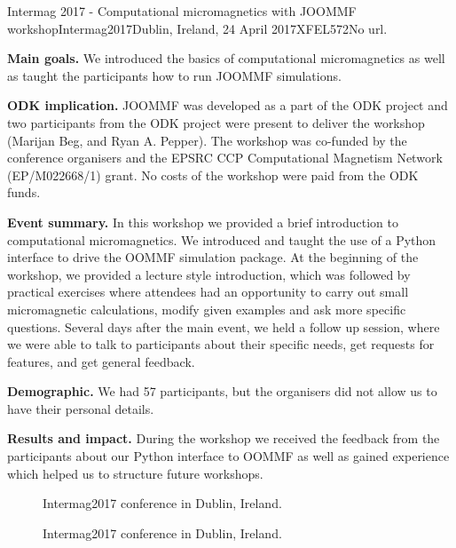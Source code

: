 \begin{event}{Intermag 2017 - Computational micromagnetics with JOOMMF workshop}{Intermag2017}{Dublin, Ireland, 24 April 2017}{XFEL}{57}{2}{No url.}

\textbf{Main goals.} We introduced the basics of computational micromagnetics as well as taught the participants how to run JOOMMF simulations.

\textbf{ODK implication.} JOOMMF was developed as a part of the ODK project and two participants from the ODK project were present to deliver the workshop (Marijan Beg, and Ryan A. Pepper). The workshop was co-funded by the conference organisers and the EPSRC CCP Computational Magnetism Network (EP/M022668/1) grant. No costs of the workshop were paid from the ODK funds.

\textbf{Event summary.} In this workshop we provided a brief introduction to computational micromagnetics. We introduced and taught the use of a Python interface to drive the OOMMF simulation package. At the beginning of the workshop, we provided a lecture style introduction, which was followed by practical exercises where attendees had an opportunity to carry out small micromagnetic calculations, modify given examples and ask more specific questions. Several days after the main event, we held a follow up session, where we were able to talk to participants about their specific needs, get requests for features, and get general feedback.

\textbf{Demographic.} We had 57 participants, but the organisers did not allow us to have their personal details.

\textbf{Results and impact.} During the workshop we received the feedback from the participants about our Python interface to OOMMF as well as gained experience which helped us to structure future workshops.

\begin{figure}[ht]

\caption*{Intermag2017 conference in Dublin, Ireland.}
\end{figure}

\begin{figure}[ht]

\caption*{Intermag2017 conference in Dublin, Ireland.}
\end{figure}

\end{event}

